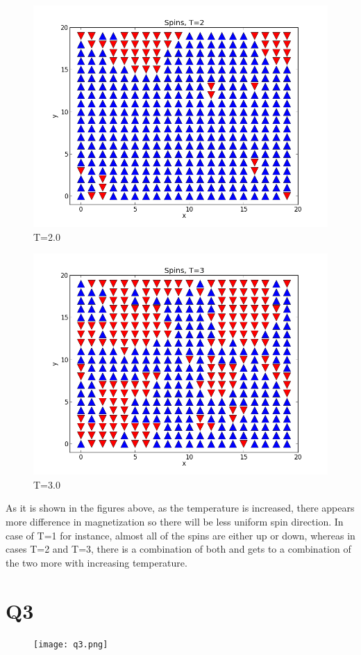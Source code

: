 \documentclass[letterpaper,12pt]{article}
\begin{document}
\FloatBarrier
\begin{figure}[H]
\centering
\includegraphics[scale=0.55]{q2_T2.png}
\caption{T=2.0}
\end{figure}
\FloatBarrier

\FloatBarrier
\begin{figure}[H]
\centering
\includegraphics[scale=0.55]{q2_T3.png}
\caption{T=3.0}
\end{figure}
\FloatBarrier


As it is shown in the figures above, as the temperature is increased, there appears more difference in magnetization so there will be less uniform spin direction. In case of T=1 for instance, almost all of the spins are either up or down, whereas in cases T=2 and T=3, there is a combination of both and gets to a combination of the two more with increasing temperature.

\section*{Q3}

%
\FloatBarrier
\begin{figure}[H]
\centering
\texttt{[image: q3.png]}
\caption{}
\end{figure}
\FloatBarrier
\end{document}
